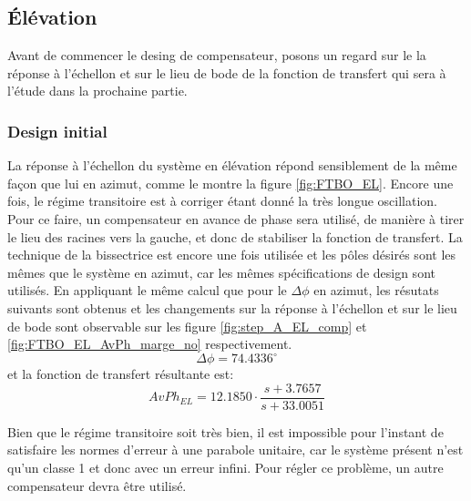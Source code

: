 \documentclass{udes_rapport} %
\begin{document}
\subsection{Élévation}
Avant de commencer le desing de compensateur, posons un regard sur le la réponse à l'échellon et sur le lieu de bode de la fonction de transfert qui sera à l'étude dans la prochaine partie.\\

\subsubsection{Design initial}
La réponse à l'échellon du système en élévation répond sensiblement de la même façon que lui en azimut, comme le montre la figure \ref{fig:FTBO_EL}.
Encore une fois, le régime transitoire est à corriger étant donné la très longue oscillation. Pour ce faire, un compensateur en avance de phase sera utilisé, de manière à tirer le lieu des racines vers la gauche, et donc de stabiliser la fonction de transfert. La technique de la bissectrice est encore une fois utilisée et les pôles désirés sont les mêmes que le système en azimut, car les mêmes spécifications de design sont utilisés. En appliquant le même calcul que pour le $\Delta \phi$ en azimut, les résutats suivants sont obtenus et les changements sur la réponse à l'échellon et sur le lieu de bode sont observable sur les figure \ref{fig:step_A_EL_comp} et \ref{fig:FTBO_EL_AvPh_marge_no} respectivement.
\[\Delta \phi = 74.4336^\circ\]
et la fonction de transfert résultante est:
\[AvPh_{EL} = 12.1850 \cdot \frac{s+3.7657}{s+33.0051}\]

Bien que le régime transitoire soit très bien, il est impossible pour l'instant de satisfaire les normes d'erreur à une parabole unitaire, car le système présent n'est qu'un classe 1 et donc avec un erreur infini. Pour régler ce problème, un autre compensateur devra être utilisé.
\end{document}
